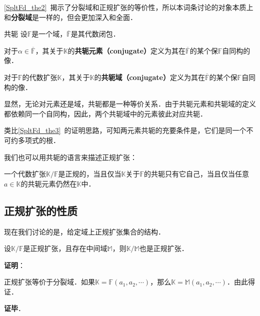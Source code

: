 

\autoref{SpltFd_the2}~揭示了分裂域和正规扩张的等价性，所以本词条讨论的对象本质上和\textbf{分裂域}是一样的，但会更加深入和全面．


\begin{definition}{共轭}
设$\mathbb{F}$是一个域，$\overline{\mathbb{F}}$是其代数闭包．

对于$\alpha\in\overline{\mathbb{F}}$，其关于$\mathbb{K}$的\textbf{共轭元素（conjugate）}定义为其在$\overline{\mathbb{F}}$的某个保$\mathbb{F}$自同构的像．

对于$\mathbb{F}$的代数扩张$\mathbb{K}$，其关于$\mathbb{K}$的\textbf{共轭域（conjugate）}定义为其在$\overline{\mathbb{F}}$的某个保$\mathbb{F}$自同构的像．
\end{definition}

显然，无论对元素还是域，共轭都是一种等价关系．由于共轭元素和共轭域的定义都依赖同一个自同构，因此，两个共轭域中的元素彼此对应共轭．

类比\autoref{SpltFd_the3}~的证明思路，可知两元素共轭的充要条件是，它们是同一个不可约多项式的根．

我们也可以用共轭的语言来描述正规扩张：

\begin{theorem}{}\label{NomEx_the1}
一个代数扩张$\mathbb{K}/\mathbb{F}$是正规的，当且仅当$\mathbb{K}$关于$\mathbb{F}$的共轭只有它自己，当且仅当任意$a\in\mathbb{K}$的共轭元素仍然在$\mathbb{K}$中．
\end{theorem}



\subsection{正规扩张的性质}

现在我们讨论的是，给定域上正规扩张集合的结构．

\begin{theorem}{}
设$\mathbb{K}/\mathbb{F}$是正规扩张，且存在中间域$\mathbb{M}$，则$\mathbb{K}/\mathbb{M}$也是正规扩张．
\end{theorem}

\textbf{证明}：

正规扩张等价于分裂域．如果$\mathbb{K}=\mathbb{F}(a_1, a_2, \cdots)$，那么$\mathbb{K}=\mathbb{M}(a_1, a_2, \cdots)$．由此得证．

\textbf{证毕}．


